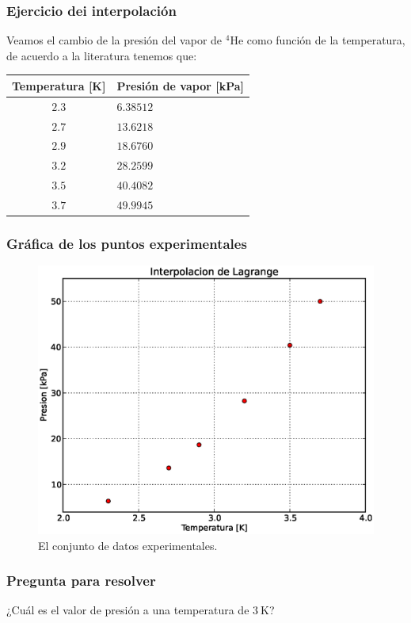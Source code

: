 \documentclass[12pt]{beamer}
\begin{document}
\begin{frame}
\frametitle{Ejercicio dei interpolación}
Veamos el cambio de la presión del vapor de {}$^{4}$He como función de la temperatura, de acuerdo a la literatura tenemos que:
\pause
\begin{center}
\renewcommand{\arraystretch}{0.9}
\begin{tabular}{c | l@{}}
Temperatura [K] & Presión de vapor [kPa] \\
\hline $2.3$ & $6.38512$ \\
\hline $2.7$ & $13.6218$ \\
\hline $2.9$ & $18.6760$ \\
\hline $3.2$ & $28.2599$ \\
\hline $3.5$ & $40.4082$ \\
\hline $3.7$ & $49.9945$
\end{tabular}
\end{center}
\end{frame}
\begin{frame}
\frametitle{Gráfica de los puntos experimentales}
\begin{figure}
	\centering
	\includegraphics[scale=0.4]{Imagenes/grafica03_1.eps}
	\caption{El conjunto de datos experimentales.}
\end{figure}
\end{frame}
\begin{frame}
\frametitle{Pregunta para resolver}
¿Cuál es el valor de presión a una temperatura de $\SI{3}{\kelvin}$?
\end{frame}
\end{document}
